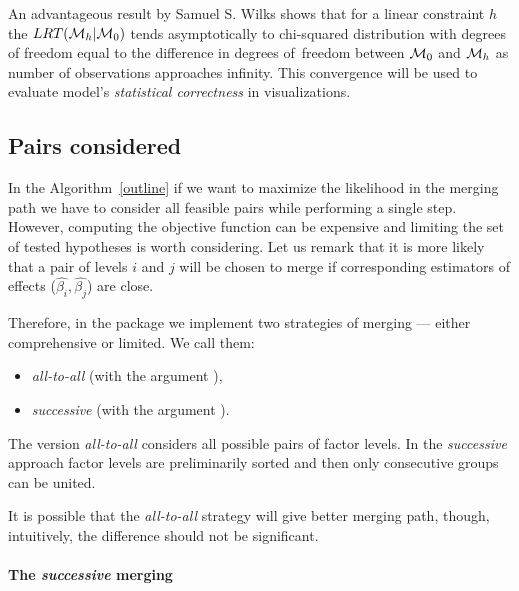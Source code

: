 An advantageous result by Samuel S. Wilks \citep{wilks1938large} shows that for a linear constraint $h$ the $LRT(\mathcal{M}_h|\mathcal{M}_0)$ tends asymptotically to chi-squared distribution with degrees of freedom equal to the difference in degrees of~freedom between $\mathcal{M}_0$ and $\mathcal{M}_h$ as number of observations approaches infinity. This convergence will be used to evaluate model's \emph{statistical correctness} in visualizations.



\subsection{Pairs considered}

In the Algorithm~\ref{outline} if we want to maximize the likelihood in the merging path we have to consider all feasible pairs while performing a single step. However, 
computing the objective function can be expensive and limiting the set of tested hypotheses is worth considering. Let us remark that it is more likely that a pair of levels $i$ and $j$ will be chosen to merge if corresponding estimators of effects ($\hat{\beta_i}, \hat{\beta_j}$) are close.


Therefore, in the package we implement two strategies of merging --- either comprehensive or limited. We call them:

\begin{itemize}
\item \emph{all-to-all} (with the argument ),
\item \emph{successive} (with the argument ).

\end{itemize}

The version \emph{all-to-all} considers all possible pairs of factor levels. In the \emph{successive} approach factor levels are preliminarily sorted and then only consecutive groups can be united. 

It is possible that the \emph{all-to-all} strategy will give better merging path, though, intuitively, the difference should not be significant.


\break 

\paragraph{The \emph{successive} merging}

